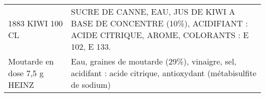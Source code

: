 \begin{longtable}{p{5cm}p{10cm}}
                                                                                         1883 KIWI 100 CL &                                                                                                                                                                                                                                                                                                                                                                                                                                                                                                                                                                                                                                                                                                                                                                                                                                                                                                                SUCRE DE CANNE, EAU, JUS DE KIWI A BASE DE CONCENTRE (10\%), ACIDIFIANT : ACIDE CITRIQUE, AROME, COLORANTS : E 102, E 133. \\
                                                                             Moutarde en dose 7,5 g HEINZ &                                                                                                                                                                                                                                                                                                                                                                                                                                                                                                                                                                                                                                                                                                                                                                                                                                                                                                                         Eau, graines de moutarde (29\%), vinaigre, sel, acidifant : acide citrique, antioxydant (métabisulfite de sodium) \\

\end{longtable}
